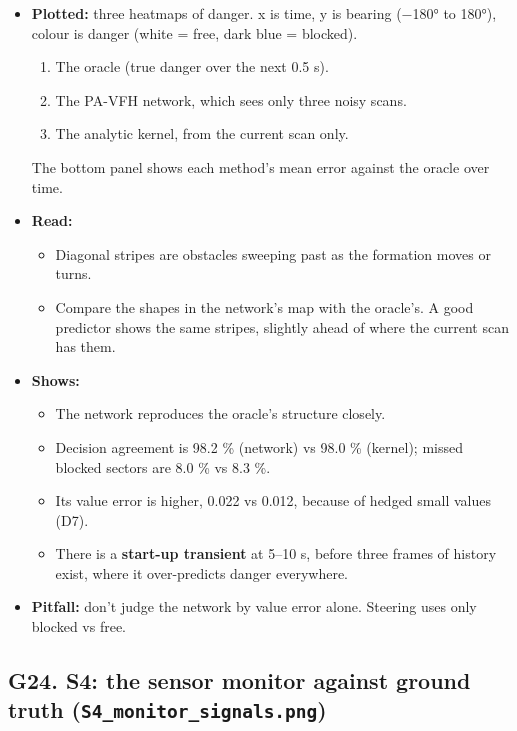 \documentclass[
  10.5pt,
  a4paper,
]{article}
\providecommand{\tightlist}{%
  \setlength{\itemsep}{0pt}\setlength{\parskip}{0pt}}
\begin{document}
\begin{itemize}
\tightlist
\item
  \textbf{Plotted:} three heatmaps of danger. x is time, y is bearing
  (−180° to 180°), colour is danger (white = free, dark blue = blocked).

  \begin{enumerate}
  \def\labelenumi{\arabic{enumi}.}
  \tightlist
  \item
    The oracle (true danger over the next 0.5 s).
  \item
    The PA-VFH network, which sees only three noisy scans.
  \item
    The analytic kernel, from the current scan only.
  \end{enumerate}

  The bottom panel shows each method's mean error against the oracle
  over time.
\item
  \textbf{Read:}

  \begin{itemize}
  \tightlist
  \item
    Diagonal stripes are obstacles sweeping past as the formation moves
    or turns.
  \item
    Compare the shapes in the network's map with the oracle's. A good
    predictor shows the same stripes, slightly ahead of where the
    current scan has them.
  \end{itemize}
\item
  \textbf{Shows:}

  \begin{itemize}
  \tightlist
  \item
    The network reproduces the oracle's structure closely.
  \item
    Decision agreement is 98.2 \% (network) vs 98.0 \% (kernel); missed
    blocked sectors are 8.0 \% vs 8.3 \%.
  \item
    Its value error is higher, 0.022 vs 0.012, because of hedged small
    values (D7).
  \item
    There is a \textbf{start-up transient} at 5--10 s, before three
    frames of history exist, where it over-predicts danger everywhere.
  \end{itemize}
\item
  \textbf{Pitfall:} don't judge the network by value error alone.
  Steering uses only blocked vs free.
\end{itemize}

\hypertarget{g24.-s4-the-sensor-monitor-against-ground-truth-s4_monitor_signals.png}{%
\subsection{\texorpdfstring{G24. S4: the sensor monitor against ground
truth
(\texttt{S4\_monitor\_signals.png})}{G24. S4: the sensor monitor against ground truth (S4\_monitor\_signals.png)}}\label{g24.-s4-the-sensor-monitor-against-ground-truth-s4_monitor_signals.png}}
\end{document}
